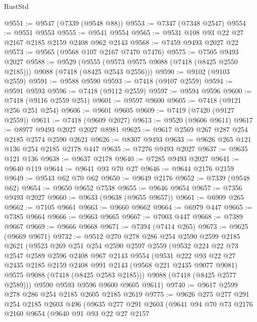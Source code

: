 \begin{lexlean}{RustStd}
\begin{coremodule}
@9551 := @9547 (@7339 (@9548 @88))
@9553 := @7347 (@7348 @2547)
@9554 := @9551 @9553
@9555 := @9541 @9554
@9565 := @9531 @108 @93 @22 @27 @2167 @2185 @2159 @2408 @962 @2143
@9568 := @7459 @9493 @2027 @22
@9573 := @9565 (@9568 @107 @2167 @7470 @7476)
@9575 := @7505 @9493 @2027
@9588 := @9529
    (@9555 (@9573 @9575 @9088 (@7418 (@8425 @2550 @2185))) @9088 (@7418 (@8425 @2543 @2556)))
@9590 := @9102 (@9103 @2559)
@9591 := @9588 @9590
@9593 := @7418 (@9107 @2559)
@9594 := @9591 @9593
@9596 := @7418 (@9112 @2559)
@9597 := @9594 @9596
@9600 := @7418 (@9116 @2559 @251)
@9601 := @9597 @9600
@9605 := @7418 (@9121 @256 @251 @254)
@9606 := @9601 @9605
@9609 := @7419 (@7420 (@9127 @2559))
@9611 := @7418 (@9609 @2027)
@9613 := @9520 (@9606 @9611)
@9617 := @8977 @9493 @2027 @2027 @8981
@9625 := @9617 @2569 @267 @287 @254 @2185 @2574 @2590 @2621
@9626 := @8307 @9493
@9633 := @9626 @265 @121 @136 @254 @2185 @2178 @447
@9635 := @7276 @9493 @2027
@9637 := @9635 @121 @136
@9638 := @9637 @2178
@9640 := @7285 @9493 @2027
@9641 := @9640 @119
@9644 := @9641 @93 @70 @27
@9646 := @9644 @2176 @2159
@9649 := @9543 @62 @70 @62
@9650 := @9649 @2176
@9652 := @7339 (@9548 @62)
@9654 := @9650 @9652 @7538
@9655 := @9646 @9654
@9657 := @7356 @9493 @2027
@9660 := @9633 (@9638 (@9655 @9657))
@9661 := @6909 @265
@9662 := @7105 @9661
@9663 := @9660 @9662
@9664 := @6979 @447
@9665 := @7385 @9664
@9666 := @9663 @9665
@9667 := @7003 @447
@9668 := @7389 @9667
@9669 := @9666 @9668
@9671 := @7394 (@7414 @265)
@9673 := @9625 (@9669 @9671)
@9732 := @9512
    @270
    @278
    @286
    @254
    @2590
    @2599
    @2185
    @2621
    (@9523
      @269
      @251
      @254
      @2590
      @2597
      @2559
      (@9532
        @224
        @22
        @73
        @2547
        @2589
        @2596
        @2408
        @967
        @2143
        @9554
        (@9531
          @222
          @93
          @22
          @27
          @2435
          @2185
          @2159
          @2408
          @991
          @2143
          (@9568 @221 @2435 @9077 @9081)
          @9575
          @9088
          (@7418 (@8425 @2583 @2185)))
        @9088
        (@7418 (@8425 @2577 @2589)))
      @9590
      @9593
      @9596
      @9600
      @9605
      @9611)
@9740 := @9617 @2599 @278 @286 @254 @2185 @2605 @2185 @2619
@9775 := @9626
    @275
    @277
    @291
    @254
    @2185
    @2603
    @496
    (@9635
      @277
      @291
      @2603
      (@9641
        @94
        @70
        @73
        @2176
        @2160
        @9654
        (@9640
          @91
          @93
          @22
          @27
          @2157

\end{coremodule}
\end{lexlean}
